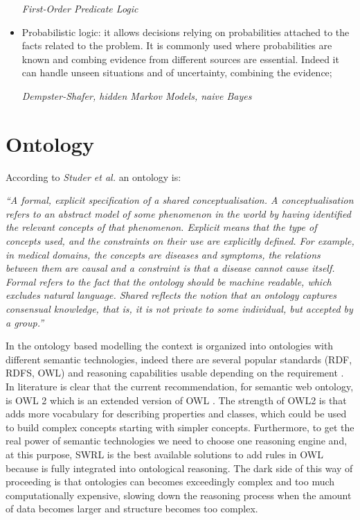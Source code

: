 \documentclass{thesisreport}
\begin{document}
\begin{itemize}
     \textit{First-Order Predicate Logic}
     
     \item Probabilistic logic: it allows decisions relying on probabilities attached to the facts related to the problem. It is commonly used where probabilities are known and combing evidence from different sources are essential. Indeed it can handle unseen situations and of uncertainty, combining the evidence; 
     
     \textit{Dempster-Shafer, hidden Markov Models, naive Bayes}
 \end{itemize}


\section{Ontology} \label{ontology}

According to \textit{Studer et al.} \cite{studer1998knowledge} an ontology is: 
\begin{center}
\textit{``A formal, explicit specification of a shared conceptualisation. A conceptualisation refers to an abstract model of some phenomenon in the world by having identified the relevant concepts of that phenomenon. Explicit means that the type of concepts used, and the constraints on their use are explicitly defined. For example, in medical domains, the concepts are diseases and symptoms, the relations between them are causal and a constraint is that a disease cannot cause itself. Formal refers to the fact that the ontology should be machine readable, which excludes natural language. Shared reflects the notion that an ontology captures consensual knowledge, that is, it is not private to some individual, but accepted by a group.”}
\end{center}


In the ontology based modelling the context is organized into ontologies with different semantic technologies, indeed there are several popular standards (RDF, RDFS, OWL) and reasoning capabilities usable depending on the requirement \cite{perera2014context}. 
In literature is clear that the current recommendation, for semantic web ontology, is OWL 2 which is an extended version of OWL \cite{perera2014context}. The strength of OWL2 is that adds more vocabulary for describing properties and classes, which could be used to build complex concepts starting with simpler concepts.
Furthermore, to get the real power of semantic technologies we need to choose one reasoning engine and, at this purpose, SWRL is the best available solutions to add rules in OWL because is fully integrated into ontological reasoning. The dark side of this way of proceeding is that ontologies can becomes exceedingly complex and too much computationally expensive, slowing down the reasoning process when the amount of data becomes larger and structure becomes too complex.
\end{document}
